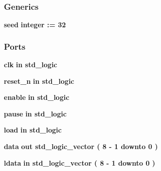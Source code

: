 \subsubsection*{Generics}
 \begin{DoxyCompactItemize}
\item 
{\bf seed} {\bfseries {\bfseries \textcolor{comment}{integer}\textcolor{vhdlchar}{ }\textcolor{vhdlchar}{ }\textcolor{vhdlchar}{\+:}\textcolor{vhdlchar}{=}\textcolor{vhdlchar}{ }\textcolor{vhdlchar}{ } \textcolor{vhdldigit}{32} \textcolor{vhdlchar}{ }}}
\end{DoxyCompactItemize}
\subsubsection*{Ports}
 \begin{DoxyCompactItemize}
\item 
{\bf clk}  {\bfseries {\bfseries \textcolor{keywordflow}{in}\textcolor{vhdlchar}{ }}} {\bfseries \textcolor{comment}{std\+\_\+logic}\textcolor{vhdlchar}{ }} 
\item 
{\bf reset\+\_\+n}  {\bfseries {\bfseries \textcolor{keywordflow}{in}\textcolor{vhdlchar}{ }}} {\bfseries \textcolor{comment}{std\+\_\+logic}\textcolor{vhdlchar}{ }} 
\item 
{\bf enable}  {\bfseries {\bfseries \textcolor{keywordflow}{in}\textcolor{vhdlchar}{ }}} {\bfseries \textcolor{comment}{std\+\_\+logic}\textcolor{vhdlchar}{ }} 
\item 
{\bf pause}  {\bfseries {\bfseries \textcolor{keywordflow}{in}\textcolor{vhdlchar}{ }}} {\bfseries \textcolor{comment}{std\+\_\+logic}\textcolor{vhdlchar}{ }} 
\item 
{\bf load}  {\bfseries {\bfseries \textcolor{keywordflow}{in}\textcolor{vhdlchar}{ }}} {\bfseries \textcolor{comment}{std\+\_\+logic}\textcolor{vhdlchar}{ }} 
\item 
{\bf data}  {\bfseries {\bfseries \textcolor{keywordflow}{out}\textcolor{vhdlchar}{ }}} {\bfseries \textcolor{comment}{std\+\_\+logic\+\_\+vector}\textcolor{vhdlchar}{ }\textcolor{vhdlchar}{(}\textcolor{vhdlchar}{ }\textcolor{vhdlchar}{ } \textcolor{vhdldigit}{8} \textcolor{vhdlchar}{-\/}\textcolor{vhdlchar}{ } \textcolor{vhdldigit}{1} \textcolor{vhdlchar}{ }\textcolor{keywordflow}{downto}\textcolor{vhdlchar}{ }\textcolor{vhdlchar}{ } \textcolor{vhdldigit}{0} \textcolor{vhdlchar}{ }\textcolor{vhdlchar}{)}\textcolor{vhdlchar}{ }} 
\item 
{\bf ldata}  {\bfseries {\bfseries \textcolor{keywordflow}{in}\textcolor{vhdlchar}{ }}} {\bfseries \textcolor{comment}{std\+\_\+logic\+\_\+vector}\textcolor{vhdlchar}{ }\textcolor{vhdlchar}{(}\textcolor{vhdlchar}{ }\textcolor{vhdlchar}{ } \textcolor{vhdldigit}{8} \textcolor{vhdlchar}{-\/}\textcolor{vhdlchar}{ } \textcolor{vhdldigit}{1} \textcolor{vhdlchar}{ }\textcolor{keywordflow}{downto}\textcolor{vhdlchar}{ }\textcolor{vhdlchar}{ } \textcolor{vhdldigit}{0} \textcolor{vhdlchar}{ }\textcolor{vhdlchar}{)}\textcolor{vhdlchar}{ }} 
\end{DoxyCompactItemize}



